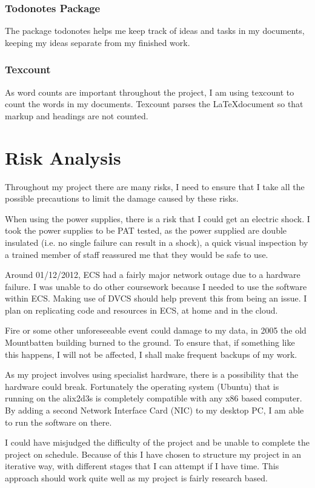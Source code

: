 \documentclass[12pt]{report}
\begin{document}
\subsubsection{Todonotes Package}
The package todonotes helps me keep track of ideas and tasks in my documents,
keeping my ideas separate from my finished work.

\subsubsection{Texcount}
As word counts are important throughout the project, I am using texcount to
count the words in my documents. Texcount parses the \LaTeX document so that
markup and headings are not counted.

\section{Risk Analysis}
Throughout my project there are many risks, I need to ensure that I take all the
possible precautions to limit the damage caused by these risks.

When using the power supplies, there is a risk that I could get an electric
shock. I took the power supplies to be PAT tested, as the power supplied are
double insulated (i.e. no single failure can result in a shock), a quick visual
inspection by a trained member of staff reassured me that they would be safe to
use. 

Around 01/12/2012, ECS had a fairly major network outage due to a hardware
failure. I was unable to do other coursework because I needed to use the
software within ECS. Making use of DVCS should help prevent this from being an
issue. I plan on replicating code and resources in ECS, at home and in the
cloud. 

Fire or some other unforeseeable event could damage to my data, in 2005 the old
Mountbatten building burned to the ground. To ensure that, if something like
this happens, I will not be affected, I shall make frequent backups of my work.

As my project involves using specialist hardware, there is a possibility that
the hardware could break. Fortunately the operating system (Ubuntu) that is
running on the alix2d3s is completely compatible with any x86 based computer. By
adding a second Network Interface Card (NIC)  to my desktop PC, I am able to run the software on there. 

I could have misjudged the difficulty of the project and be unable to complete
the project on schedule.  Because of this I have chosen to structure my project
in an iterative way, with different stages that I can attempt if I have time.
This approach should work quite well as my project is fairly research based. 
\end{document}
